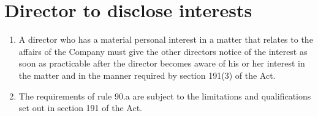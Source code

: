 \section{Director to disclose interests}

\begin{enumerate}[label=(\alph*)]
    \item A director who has a material personal interest in a matter that relates to the affairs of the Company must give the other directors notice of the interest as soon as practicable after the director becomes aware of his or her interest in the matter and in the manner required by section 191(3) of the Act.
    
    \item The requirements of rule 90.a are subject to the limitations and qualifications set out in section 191 of the Act.
\end{enumerate} 